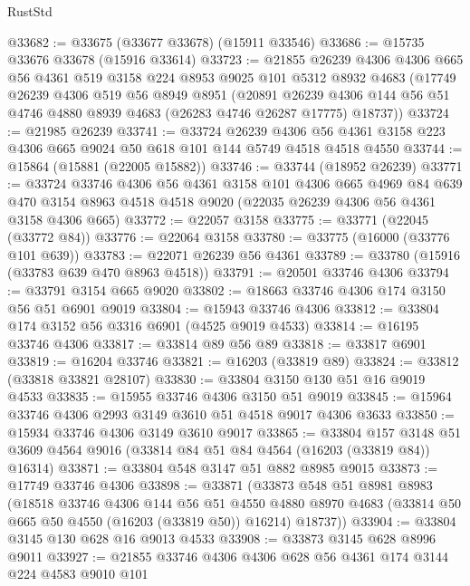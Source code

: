 \begin{lexlean}{RustStd}
\begin{coremodule}
@33682 := @33675 (@33677 @33678) (@15911 @33546)
@33686 := @15735 @33676 @33678 (@15916 @33614)
@33723 := @21855
    @26239
    @4306
    @4306
    @665
    @56
    @4361
    @519
    @3158
    @224
    @8953
    @9025
    @101
    @5312
    @8932
    @4683
    (@17749
      @26239
      @4306
      @519
      @56
      @8949
      @8951
      (@20891
        @26239
        @4306
        @144
        @56
        @51
        @4746
        @4880
        @8939
        @4683
        (@26283 @4746 @26287 @17775)
        @18737))
@33724 := @21985 @26239
@33741 := @33724
    @26239
    @4306
    @56
    @4361
    @3158
    @223
    @4306
    @665
    @9024
    @50
    @618
    @101
    @144
    @5749
    @4518
    @4518
    @4550
@33744 := @15864 (@15881 (@22005 @15882))
@33746 := @33744 (@18952 @26239)
@33771 := @33724
    @33746
    @4306
    @56
    @4361
    @3158
    @101
    @4306
    @665
    @4969
    @84
    @639
    @470
    @3154
    @8963
    @4518
    @4518
    @9020
    (@22035 @26239 @4306 @56 @4361 @3158 @4306 @665)
@33772 := @22057 @3158
@33775 := @33771 (@22045 (@33772 @84))
@33776 := @22064 @3158
@33780 := @33775 (@16000 (@33776 @101 @639))
@33783 := @22071 @26239 @56 @4361
@33789 := @33780 (@15916 (@33783 @639 @470 @8963 @4518))
@33791 := @20501 @33746 @4306
@33794 := @33791 @3154 @665 @9020
@33802 := @18663 @33746 @4306 @174 @3150 @56 @51 @6901 @9019
@33804 := @15943 @33746 @4306
@33812 := @33804 @174 @3152 @56 @3316 @6901 (@4525 @9019 @4533)
@33814 := @16195 @33746 @4306
@33817 := @33814 @89 @56 @89
@33818 := @33817 @6901
@33819 := @16204 @33746
@33821 := @16203 (@33819 @89)
@33824 := @33812 (@33818 @33821 @28107)
@33830 := @33804 @3150 @130 @51 @16 @9019 @4533
@33835 := @15955 @33746 @4306 @3150 @51 @9019
@33845 := @15964 @33746 @4306 @2993 @3149 @3610 @51 @4518 @9017 @4306 @3633
@33850 := @15934 @33746 @4306 @3149 @3610 @9017
@33865 := @33804
    @157
    @3148
    @51
    @3609
    @4564
    @9016
    (@33814 @84 @51 @84 @4564 (@16203 (@33819 @84)) @16314)
@33871 := @33804 @548 @3147 @51 @882 @8985 @9015
@33873 := @17749 @33746 @4306
@33898 := @33871
    (@33873
      @548
      @51
      @8981
      @8983
      (@18518
        @33746
        @4306
        @144
        @56
        @51
        @4550
        @4880
        @8970
        @4683
        (@33814 @50 @665 @50 @4550 (@16203 (@33819 @50)) @16214)
        @18737))
@33904 := @33804 @3145 @130 @628 @16 @9013 @4533
@33908 := @33873 @3145 @628 @8996 @9011
@33927 := @21855
    @33746
    @4306
    @4306
    @628
    @56
    @4361
    @174
    @3144
    @224
    @4583
    @9010
    @101

\end{coremodule}
\end{lexlean}
